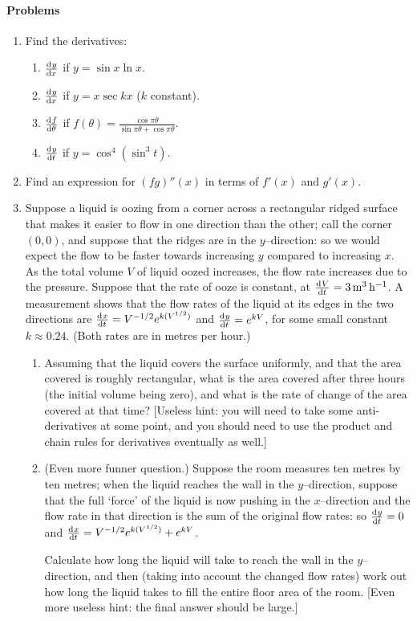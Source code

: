 \paragraph{Problems}
\begin{enumerate}
  \item Find the derivatives:
    \begin{enumerate}
      \item $ \od{y}{x} $ if $ y = \sin x \ln x $.
      \item $ \od{y}{x} $ if $ y = x \sec kx $ ($ k $ constant).
      \item $ \od{f}{\theta} $ if $ f(\theta) = \frac{\cos \pi \theta}{\sin \pi \theta + \cos \pi \theta} $.
      \item $ \od{y}{t} $ if $ y = \cos^4 (\sin^3 t) $.
    \end{enumerate}
  \item Find an expression for $ (fg)''(x) $ in terms of $ f'(x) $ and $ g'(x) $.
  \item Suppose a liquid is oozing from a corner across a rectangular ridged surface that makes it
        easier to flow in one direction than the other; call the corner $ (0,0) $, and suppose that
        the ridges are in the $ y$--direction: so we would expect the flow to be faster towards increasing
        $ y $ compared to increasing $ x $. As the total volume $ V $ of liquid oozed increases, the flow rate increases
        due to the pressure. Suppose that the rate of ooze is constant, at $ \od{V}{t} = \SI{3}{\metre\cubed\per\hour} $.
        A measurement shows that the flow rates of the liquid at its edges in the two directions are $ \od{x}{t} = V^{-1/2} e^{k(V^{1/2})} $
        and $ \od{y}{t} = e^{kV} $, for some small constant $ k \approx 0.24 $. (Both rates are in metres per hour.)
    \begin{enumerate}
      \item Assuming that the liquid covers the surface uniformly, and that the area covered is roughly rectangular,
            what is the area covered after three hours (the initial volume being zero), and what is the rate of change
            of the area covered at that time? [Useless hint: you will need to take some anti-derivatives at some point, and you
            should need to use the product and chain rules for derivatives eventually as well.]
      \item (Even more funner question.) Suppose the room measures ten metres by ten metres; when the liquid reaches the wall
            in the $ y$--direction, suppose that the full `force' of the liquid is now pushing in the $ x$--direction and the
            flow rate in that direction is the sum of the original flow rates: so $ \od{y}{t} = 0 $ and $ \od{x}{t} = V^{-1/2} e^{k(V^{1/2})} + e^{kV} $.

            Calculate how long the liquid will take to reach the wall in the $ y$--direction, and then (taking into account
            the changed flow rates) work out how long the liquid takes to fill the entire floor area of the room. [Even more
            useless hint: the final answer should be large.]
    \end{enumerate}
\end{enumerate}
